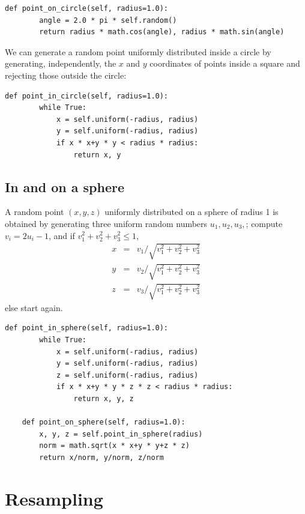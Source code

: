 \documentclass[justified, sixbynine]{tufte-book}
\def\ft{\small\tt}
\theoremstyle{plain}%
\newtheorem * {corollary}{Corollary}
\theoremstyle{definition}
\theoremstyle{remark}
\newtheorem * {remark}{Remark}
\newtheorem * {note}{Note}
\begin{document}
\begin{fullwidth}
\begin{lstlisting}[caption={in file: {\ft nlib.py}}]
    def point_on_circle(self, radius=1.0):
        angle = 2.0 * pi * self.random()
        return radius * math.cos(angle), radius * math.sin(angle)
\end{lstlisting}

We can generate a random point uniformly distributed inside a circle by generating, independently, the $x$ and $y$ coordinates of points inside a square and rejecting those outside the circle:

\begin{lstlisting}[caption={in file: {\ft nlib.py}}]
    def point_in_circle(self, radius=1.0):
        while True:
            x = self.uniform(-radius, radius)
            y = self.uniform(-radius, radius)
            if x * x+y * y < radius * radius:
                return x, y
\end{lstlisting}

\goodbreak\subsection{In and on a sphere}

A random point $(x, y, z)$ uniformly distributed on a sphere of radius 1 is
obtained by generating three uniform random numbers $u_1, u_2, u_3, $; compute $%
v_i=2u_i-1$, and if $v_1^2+v_2^2+v_3^2\leq 1$, 
\begin{eqnarray}
x &=&v_1/\sqrt{v_1^2+v_2^2+v_3^2} \\
y &=&v_2/\sqrt{v_1^2+v_2^2+v_3^2} \\
z &=&v_3/\sqrt{v_1^2+v_2^2+v_3^2}
\end{eqnarray}
else start again.

\begin{lstlisting}[caption={in file: {\ft nlib.py}}]
    def point_in_sphere(self, radius=1.0):
        while True:
            x = self.uniform(-radius, radius)
            y = self.uniform(-radius, radius)
            z = self.uniform(-radius, radius)
            if x * x+y * y * z * z < radius * radius:
                return x, y, z

    def point_on_sphere(self, radius=1.0):
        x, y, z = self.point_in_sphere(radius)
        norm = math.sqrt(x * x+y * y+z * z)
        return x/norm, y/norm, z/norm
\end{lstlisting}

\section{Resampling}


\end{fullwidth}
\end{document}
